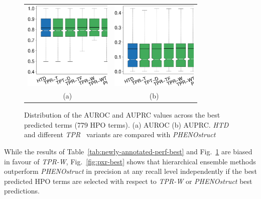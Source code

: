 \documentclass{bioinfo}
\newcommand{\htd}{{\em HTD}}
\newcommand{\tpr}{{\em TPR}}
\begin{document}
\begin{figure}[!h]
\centering
\begin{tabular}{cc}	
\includegraphics[width=4.2cm]{Fig_ExpII/BoxPlot_AUC70_Shrink_TPRWfilter.eps} &
\includegraphics[width=4.2cm]{Fig_ExpII/BoxPlot_PRC70_Shrink_TPRWfilter.eps} \\
(a) & (b)\\ 
\end{tabular}
\caption{Distribution of the AUROC and AUPRC values across the best predicted terms (779 HPO terms). (a) AUROC (b) AUPRC. \htd~ and different \tpr~ variants are compared with {\em PHENOstruct}}
\label{fig:boxplot-best}
\end{figure}

While the results of Table~\ref{tab:newly-annotated-perf-best} and Fig.~\ref{fig:boxplot-best} are biased in favour of \textsl{TPR-W}, Fig.~\ref{fig:pxr-best} shows that hierarchical ensemble methods outperform {\em PHENOstruct} in precision at any recall level independently if the best predicted HPO terms are selected with respect to {\em TPR-W} or {\em PHENOstruct} best predictions.
\end{document}
